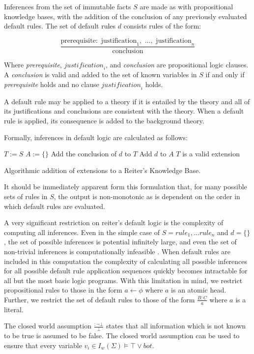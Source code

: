 Inferences from the set of immutable facts $S$ are made as with propositional knowledge bases, with the addition of the conclusion of any previously evaluated default rules. The set of default rules $d$ consists rules of the form:

\[\frac{\textrm{prerequisite}:\textrm{ justification}_1, \textrm{ ...}, \textrm{ justification}_n}{\textrm{conclusion}}\]

Where \textit{prerequisite}, $\textit{justification}_i$, and \textit{conclusion} are propositional logic clauses. A \textit{conclusion} is valid and added to the set of known variables in $S$ if and only if \textit{prerequisite} holds and no clause $\textit{justification}_i$ holds.


A default rule may be applied to a theory if it is entailed by the theory and all of its justifications and conclusions are consistent with the theory. When a default rule is applied, its consequence is added to the background theory.

Formally, inferences in default logic are calculated as follows:



\begin{algorithm}[H] \label{alg:reiter}
\SetAlgoLined
{}
{
$T:=S$\;
$A:=\{\}$\;
{
Add the conclusion of $d$ to $T$\;
Add 	$d$ to $A$\;
}
{
$T$ is a valid extension\;
}
}

\caption{Algorithmic addition of extensions to a Reiter's Knowledge Base.}
\end{algorithm}

It should be immediately apparent form this formulation that, for many possible sets of rules in $S$, the output is non-monotonic as is dependent on the order in which default rules are evaluated.

A very significant restriction on reiter's default logic is the complexity of computing all inferences. Even in the simple case of $S={rule_1,...rule_n}$ and $d=\{\}$, the set of possible inferences is potential infinitely large, and even the set of non-trivial inferences is computationally infeasible \citep{schaefer1978complexity}. When default rules are included in this computation the complexity of calculating all possible inferences for all possible default rule application sequences quickly becomes intractable for all but the most basic logic programs. With this limitation in mind, we restrict propositional rules to those in the form $a\leftarrow\phi$ where $a$ is an atomic head. Further, we restrict the set of default rules to those of the form $\frac{B:C}{a}$ where $a$ is a literal.

The closed world assumption $\frac{: \lnot \bot}{\bot}$ states that all information which is not known to be true is assumed to be false. The closed world assumption can be used to ensure that every variable $v_i \in I_w(\Sigma) \models \top \lor bot$.